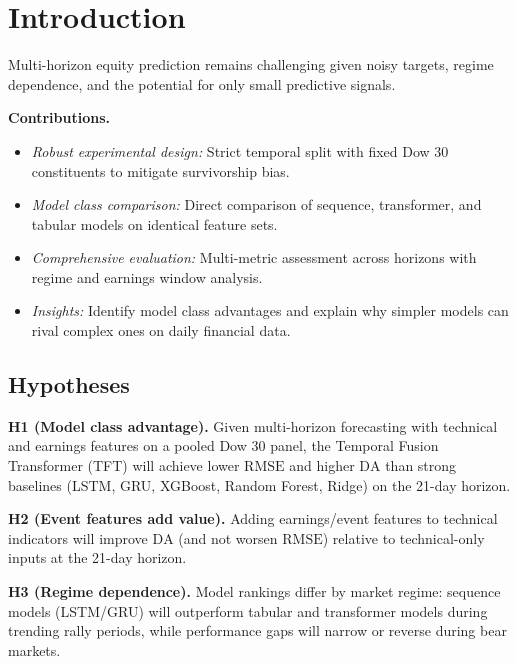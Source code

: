 \documentclass[conference,a4paper]{IEEEtran}
\newcommand{\rmse}{\ensuremath{\mathrm{RMSE}}}
\newcommand{\da}{\ensuremath{\mathrm{DA}}}
\begin{document}
\section{Introduction}
Multi-horizon equity prediction remains challenging given noisy targets, regime dependence, and the potential for only small predictive signals.

\textbf{Contributions.}
\begin{itemize}
    \item \textit{Robust experimental design:} Strict temporal split with fixed Dow 30 constituents to mitigate survivorship bias.
    \item \textit{Model class comparison:} Direct comparison of sequence, transformer, and tabular models on identical feature sets.
    \item \textit{Comprehensive evaluation:} Multi-metric assessment across horizons with regime and earnings window analysis.
    \item \textit{Insights:} Identify model class advantages and explain why simpler models can rival complex ones on daily financial data.
\end{itemize}

\subsection{Hypotheses}

\textbf{H1 (Model class advantage).} Given multi-horizon forecasting with technical and earnings features on a pooled Dow 30 panel, the Temporal Fusion Transformer (TFT) will achieve lower \rmse{} and higher \da{} than strong baselines (LSTM, GRU, XGBoost, Random Forest, Ridge) on the 21-day horizon.

\textbf{H2 (Event features add value).} Adding earnings/event features to technical indicators will improve \da{} (and not worsen \rmse{}) relative to technical-only inputs at the 21-day horizon.

\textbf{H3 (Regime dependence).} Model rankings differ by market regime: sequence models (LSTM/GRU) will outperform tabular and transformer models during trending rally periods, while performance gaps will narrow or reverse during bear markets.
\end{document}
